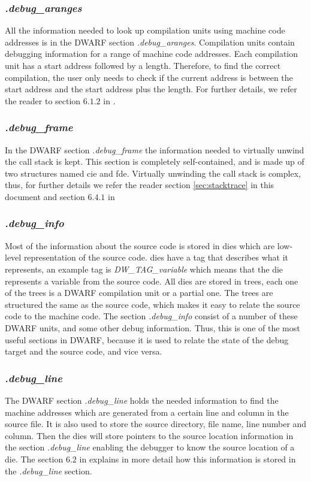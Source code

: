 \subsubsection{\emph{.debug\_aranges}}
All the information needed to look up compilation units using machine code addresses is in the \gls{DWARF} section \emph{.debug\_aranges}.
Compilation units contain debugging information for a range of machine code addresses.
Each compilation unit has a start address followed by a length.
Therefore, to find the correct compilation, the user only needs to check if the current address is between the start address and the start address plus the length.
For further details, we refer the reader to section $6.1.2$ in \cite{dwarf}.


\subsubsection{\emph{.debug\_frame}}
In the \gls{DWARF} section \emph{.debug\_frame} the information needed to virtually unwind the call stack is kept.
This section is completely self-contained, and is made up of two structures named \acrfull{cie} and \acrfull{fde}.
Virtually unwinding the call stack is complex, thus, for further details we refer the reader section \ref{sec:stacktrace} in this document and section $6.4.1$ in \cite{dwarf}


\subsubsection{\emph{.debug\_info}}
Most of the information about the source code is stored in \glspl{die} which are low-level representation of the source code.
\glspl{die} have a tag that describes what it represents, an example tag is \emph{DW\_TAG\_variable} which means that the \gls{die} represents a variable from the source code.
All \glspl{die} are stored in trees, each one of the trees is a \gls{DWARF} compilation unit or a partial one.
The trees are structured the same as the source code, which makes it easy to relate the source code to the machine code.
The section \emph{.debug\_info} consist of a number of these \gls{DWARF} units, and some other debug information.
Thus, this is one of the most useful sections in \gls{DWARF}, because it is used to relate the state of the debug target and the source code, and vice versa.


\subsubsection{\emph{.debug\_line}}
The \gls{DWARF} section \emph{.debug\_line} holds the needed information to find the machine addresses which are generated from a certain line and column in the source file.
It is also used to store the source directory, file name, line number and column.
Then the \glspl{die} will store pointers to the source location information in the section \emph{.debug\_line} enabling the debugger to know the source location of a \gls{die}.
The section $6.2$ in \cite{dwarf} explains in more detail how this information is stored in the \emph{.debug\_line} section.


